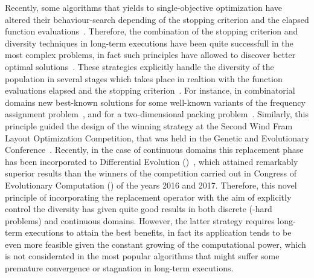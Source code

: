 Recently, some algorithms that yields to single-objective optimization have altered their behaviour-search depending of the stopping criterion and the elapsed function evaluations~\cite{castillo2019differential}.
%
Therefore, the combination of the stopping criterion and diversity techniques in long-term executions have been quite successfull in the most complex problems, in fact such principles have allowed to discover better optimal solutions~\cite{segura2016improving}.
%
These strategies explicitly handle the diversity of the population in several stages which takes place in realtion with the function evaluations elapsed and the stopping criterion~\cite{segura2015novel}.
%
For instance, in combinatorial domains new best-known solutions for some well-known variants of the frequency assignment problem~\cite{segura2016improving}, and for a two-dimensional packing problem~\cite{de2010optimisation}.
%
Similarly, this principle guided the design of the winning strategy at the Second Wind Fram Layout Optimization Competition, that was held in the Genetic and Evolutionary Conference~\cite{wilson2018evolutionary}.
%
Recently, in the case of continuous domains this replacement phase has been incorporated to Differential Evolution (\DE{})~\cite{castillo2019differential}, which attained remarkably superior results than the winners of the competition carried out in \IEEE{} Congress of Evolutionary Computation (\CEC{}) of the years 2016 and 2017.
%
Therefore, this novel principle of incorporating the replacement operator with the aim of explicitly control the diversity has given quite good results in both discrete (\NP{}-hard problems) and continuous domains.
%
However, the latter strategy requires long-term executions to attain the best benefits, in fact its application tends to be even more feasible given the constant growing of the computational power, which is not considerated in the most popular algorithms that might suffer some premature convergence or stagnation in long-term executions.
%

